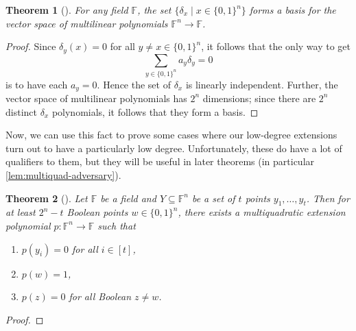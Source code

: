 \documentclass[english]{reedthesis}
\theoremstyle{plain}
\newtheorem{thm}{Theorem}[section]
\theoremstyle{definition}
\theoremstyle{remark}
\begin{document}
\begin{thm}[{\cite[]{AW09}}]
  For any field $\mathbb{F}$, the set $\{\delta_{x} \mid x \in \{0, 1\}^{n}\}$ forms a
  basis for the vector space of multilinear polynomials
  $\mathbb{F}^{n} \rightarrow \mathbb{F}$.
\end{thm}

\begin{proof}
  Since $\delta_{y}(x) = 0$ for all $y \ne x \in \{0, 1\}^{n}$, it follows that the only
  way to get
  \begin{equation}
    \sum_{y \in \{0, 1\}^{n}}a_{y}\delta_{y} = 0
  \end{equation}
  is to have each $a_{y} = 0$. Hence the set of $\delta_{x}$ is linearly independent.
  Further, the vector space of multilinear polynomials has $2^{n}$ dimensions;
  since there are $2^{n}$ distinct $\delta_{x}$ polynomials, it follows that they
  form a basis.
\end{proof}

Now, we can use this fact to prove some cases where our low-degree extensions
turn out to have a particularly low degree. Unfortunately, these do have a lot
of qualifiers to them, but they will be useful in later theorems (in particular
\cref{lem:multiquad-adversary}).

\begin{thm}[{\cite[Theorem 4.3]{AW09}}]\label{thm:multiquad-extension}
  Let $\mathbb{F}$ be a field and $Y \subseteq \mathbb{F}^{n}$ be a set of $t$ points
  $y_{1}, \ldots, y_{t}$. Then for at least $2^{n} - t$ Boolean points
  $w \in \{0, 1\}^{n}$, there exists a multiquadratic extension polynomial
  $p: \mathbb{F}^{n} \rightarrow \mathbb{F}$ such that
  \begin{enumerate}
    \item $p(y_{i}) = 0$ for all $i \in [t]$,
    \item $p(w) = 1$,
    \item $p(z) = 0$ for all Boolean $z \ne w$.
  \end{enumerate}
\end{thm}

\begin{proof}
\end{proof}
\end{document}
